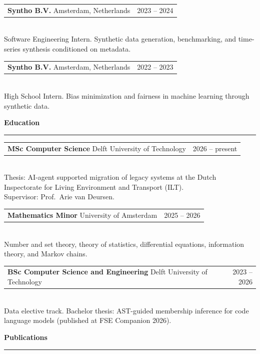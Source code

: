 \documentclass[11pt,letterpaper]{article}
\makeatletter
\newcommand{\cvsection}[1]{%
  \vspace{14pt}%
  {\large\textbf{#1}}\\[-5pt]%
  \rule{\linewidth}{0.4pt}%
  \vspace{4pt}%
}
\newcommand{\cvrow}[2]{%
  \begin{tabular*}{\linewidth}{@{}l@{\extracolsep{\fill}}r@{}}
    #1 & #2
  \end{tabular*}%
}
\makeatother
\begin{document}
\vspace{8pt}
\cvrow{%
  \textbf{Syntho B.V.} \hspace{4pt} Amsterdam, Netherlands%
}{2023 -- 2024}\\[1pt]
\hspace*{12pt} Software Engineering Intern.
Synthetic data generation, benchmarking, and time-series synthesis conditioned on metadata.

\vspace{8pt}
\cvrow{%
  \textbf{Syntho B.V.} \hspace{4pt} Amsterdam, Netherlands%
}{2022 -- 2023}\\[1pt]
\hspace*{12pt} High School Intern.
Bias minimization and fairness in machine learning through synthetic data.

\cvsection{Education}

\cvrow{%
  \textbf{MSc Computer Science} \hspace{4pt} Delft University of Technology%
}{2026 -- present}\\[2pt]
\hspace*{12pt}
Thesis: AI-agent supported migration of legacy systems at the Dutch Inspectorate for
Living Environment and Transport (ILT).\\
\hspace*{12pt}
Supervisor: Prof.\ Arie van Deursen.

\vspace{8pt}
\cvrow{%
  \textbf{Mathematics Minor} \hspace{4pt} University of Amsterdam%
}{2025 -- 2026}\\[2pt]
\hspace*{12pt}
Number and set theory, theory of statistics, differential equations, information theory,
and Markov chains.

\vspace{8pt}
\cvrow{%
  \textbf{BSc Computer Science and Engineering} \hspace{4pt} Delft University of Technology%
}{2023 -- 2026}\\[2pt]
\hspace*{12pt}
Data elective track.
Bachelor thesis: AST-guided membership inference for code language models
(published at FSE Companion 2026).

\cvsection{Publications}
\end{document}
